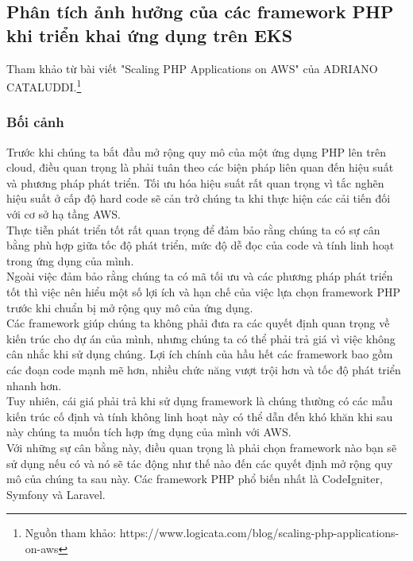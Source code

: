 \subsection{Phân tích ảnh hưởng của các framework PHP khi triển khai ứng dụng trên EKS}
\noindent Tham khảo từ bài viết "Scaling PHP Applications on AWS" của ADRIANO CATALUDDI.\protect\footnote{Nguồn tham khảo: https://www.logicata.com/blog/scaling-php-applications-on-aws}
\subsubsection{Bối cảnh}
    Trước khi chúng ta bắt đầu mở rộng quy mô của một ứng dụng PHP lên trên cloud, điều quan trọng là phải tuân theo các biện pháp liên quan đến hiệu suất và phương pháp phát triển. Tối ưu hóa hiệu suất rất quan trọng vì tắc nghẽn hiệu suất ở cấp độ hard code sẽ cản trở chúng ta khi thực hiện các cải tiến đối với cơ sở hạ tầng AWS.\\[0.5cm]
    Thực tiễn phát triển tốt rất quan trọng để đảm bảo rằng chúng ta có sự cân bằng phù hợp giữa tốc độ phát triển, mức độ dễ đọc của code và tính linh hoạt trong ứng dụng của mình.\\[0.5cm]
    Ngoài việc đảm bảo rằng chúng ta có mã tối ưu và các phương pháp phát triển tốt thì việc nên hiểu một số lợi ích và hạn chế của việc lựa chọn framework PHP trước khi chuẩn bị mở rộng quy mô của ứng dụng.\\[0.5cm]
    Các framework giúp chúng ta không phải đưa ra các quyết định quan trọng về kiến trúc cho dự án của mình, nhưng chúng ta có thể phải trả giá vì việc không cân nhắc khi sử dụng chúng. Lợi ích chính của hầu hết các framework bao gồm các đoạn code mạnh mẽ hơn, nhiều chức năng vượt trội hơn và tốc độ phát triển nhanh hơn.\\[0.5cm]
    Tuy nhiên, cái giá phải trả khi sử dụng framework là chúng thường có các mẫu kiến trúc cố định và tính không linh hoạt này có thể dẫn đến khó khăn khi sau này chúng ta muốn tích hợp ứng dụng của mình với AWS.\\[0.5cm]
    Với những sự cân bằng này, điều quan trọng là phải chọn framework nào bạn sẽ sử dụng nếu có và nó sẽ tác động như thế nào đến các quyết định mở rộng quy mô của chúng ta sau này. Các framework PHP phổ biến nhất là CodeIgniter, Symfony và Laravel.
